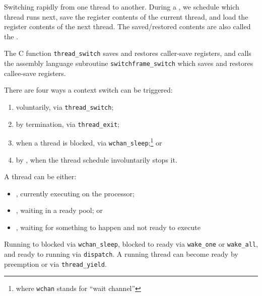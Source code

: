\begin{defn}[timeshare]
  Switching rapidly from one thread to another.
  During a , we schedule which thread runs next,
  save the register contents of the current thread, 
  and load the register contents of the next thread.
  The saved/restored contents are also called the .
\end{defn}

The C function \texttt{thread_switch} saves and restores caller-save registers,
and calls the assembly language subroutine \texttt{switchframe_switch}
which saves and restores callee-save registers.

There are four ways a context switch can be triggered:
\begin{enumerate}[1.,nosep]
  \item voluntarily, via \texttt{thread_switch};
  \item by termination, via \texttt{thread_exit};
  \item when a thread is blocked, via \texttt{wchan_sleep};\footnote{where \texttt{wchan} stands for ``wait channel''} or
  \item by , when the thread schedule involuntarily stops it.
\end{enumerate}

A thread can be either:
\begin{itemize}[nosep]
  \item {}, currently executing on the processor;
  \item {}, waiting in a ready pool; or
  \item {}, waiting for something to happen and not ready to execute
\end{itemize}
Running to blocked via \texttt{wchan_sleep},
blocked to ready via \texttt{wake_one} or \texttt{wake_all},
and ready to running via \texttt{dispatch}.
A running thread can become ready by preemption or via \texttt{thread_yield}.
